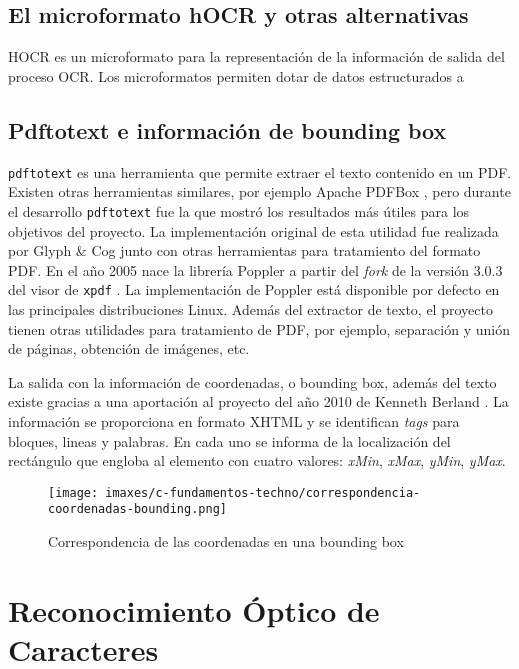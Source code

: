 \subsection{El microformato hOCR y otras alternativas}

HOCR es un microformato para la representación de la información de salida del proceso OCR. Los microformatos permiten dotar de datos estructurados a 

\subsection{Pdftotext e información de bounding box}

\verb|pdftotext| es una herramienta que permite extraer el texto contenido en un PDF. Existen otras herramientas similares, por ejemplo Apache PDFBox \cite{the_apache_software_foundation_apache_nodate}, pero durante el desarrollo \verb|pdftotext| fue la que mostró los resultados más útiles para los objetivos del proyecto. La implementación original de esta utilidad fue realizada por Glyph \& Cog \cite{glyph__cog_llc_glyph_nodate-1} junto con otras herramientas para tratamiento del formato PDF. En el año 2005 nace la librería Poppler a partir del \emph{fork} de la versión 3.0.3 del visor de \verb|xpdf| \cite{kristian_hogsberg_poppler_2012}. La implementación de Poppler está disponible por defecto en las principales distribuciones Linux. Además del extractor de texto, el proyecto tienen otras utilidades para tratamiento de PDF, por ejemplo, separación y unión de páginas, obtención de imágenes, etc.

La salida con la información de coordenadas, o bounding box, además del texto existe gracias a una aportación al proyecto del año 2010 de Kenneth Berland \cite{kenneth_berland_poppler_2010}. La información se proporciona en formato XHTML y se identifican \emph{tags} para bloques, lineas y palabras. En cada uno se informa de la localización del rectángulo que engloba al elemento con cuatro valores: \emph{xMin}, \emph{xMax}, \emph{yMin}, \emph{yMax}.

\begin{figure}[hp!]
	\centering
	\texttt{[image: imaxes/c-fundamentos-techno/correspondencia-coordenadas-bounding.png]}
	\caption{Correspondencia de las coordenadas en una bounding box}
	\label{fig:bounding-box}
\end{figure}

\section{Reconocimiento Óptico de Caracteres}

